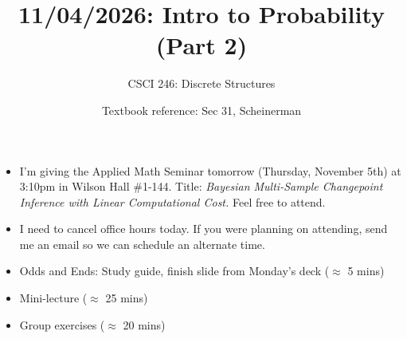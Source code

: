 \documentclass[10pt]{beamer}
\begin{document}






\title{11/04/2026: Intro to Probability (Part 2)}
\author{CSCI 246: Discrete Structures}
\date{Textbook reference: Sec 31, Scheinerman}

\begin{frame}
    \titlepage 
\end{frame}


\begin{frame}
\footnotesize 

\begin{myredbox}[title=\text{Announcements}]

\begin{itemize}
\item I'm giving the Applied Math Seminar  tomorrow (Thursday, November 5th) at 3:10pm  in Wilson Hall \#1-144.  Title: \textit{Bayesian Multi-Sample Changepoint Inference with Linear Computational Cost.} Feel free to attend.
\item I need to cancel office hours today.  If you were planning on attending, send me an email so we can schedule an alternate time.
\end{itemize}
\end{myredbox}

\vfill 


\begin{myyellowbox}[title=Today's Agenda]
\begin{itemize}
	\item Odds and Ends: Study guide, finish slide from Monday's deck ($\approx$ 5 mins)
	\item Mini-lecture ($\approx$ 25 mins)
	\item Group exercises ($\approx$ 20 mins)
\end{itemize}


\end{myyellowbox}
\vfill 

\end{frame}
\end{document}
